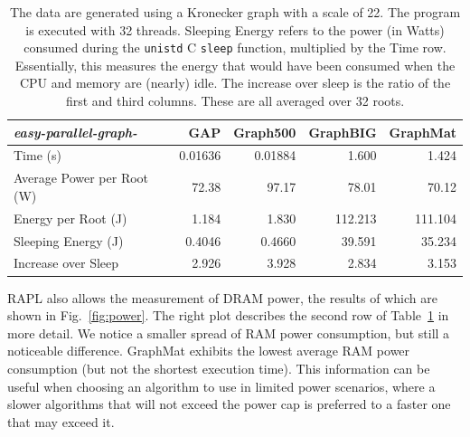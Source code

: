 \documentclass[conference]{IEEEtran}
\begin{document}
\begin{table}
	\caption{The data are generated using a Kronecker graph with a scale of 22. The program is executed with 32 threads. Sleeping Energy refers to the power (in Watts) consumed during the \texttt{unistd} C \texttt{sleep} function, multiplied by the Time row. Essentially, this measures the energy that would have been consumed when the CPU and memory are (nearly) idle. The increase over sleep is the ratio of the first and third columns. These are all averaged over 32 roots.}
	\centering
	\begin{tabular}{l|r|r|r|r}
		\large{\emph{easy-parallel-graph\mbox{-\textasteriskcentered}}}	&	GAP  &    Graph500 & GraphBIG & GraphMat \\ \hline
		Time (s) &  0.01636 & 0.01884 & 1.600 & 1.424 \\
		Average Power per Root (W) & 72.38 & 97.17 & 78.01 & 70.12 \\
		Energy per Root (J) &	1.184 & 1.830 & 112.213 & 111.104 \\
		Sleeping Energy (J) & 0.4046  & 0.4660 & 39.591 &  35.234 \\
		Increase over Sleep & 2.926 & 3.928 & 2.834 & 3.153
	\end{tabular}
	\label{tab:power}
\end{table}

RAPL also allows the measurement of DRAM power, the results of which are shown in Fig.~\ref{fig:power}. The right plot describes the second row of Table~\ref{tab:power} in more detail. We notice a smaller spread of RAM power consumption, but still a noticeable difference. GraphMat exhibits the lowest average RAM power consumption (but not the shortest execution time). This information can be useful when choosing an algorithm to use in limited power scenarios, where a slower algorithms that will not exceed the power cap is preferred to a faster one that may exceed it.
\end{document}
